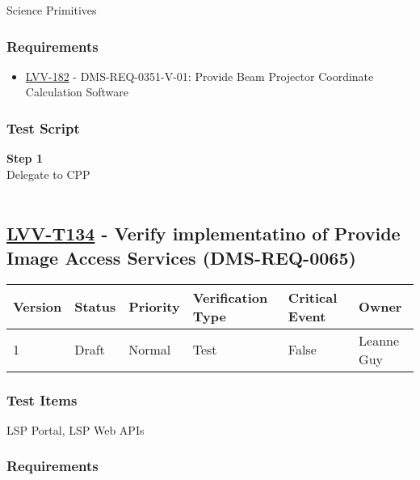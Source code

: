 Science Primitives~

\hypertarget{requirements-110}{%
\subsubsection{Requirements}\label{requirements-110}}

\begin{itemize}
\tightlist
\item
  \href{https://jira.lsstcorp.org/browse/LVV-182}{LVV-182} -
  DMS-REQ-0351-V-01: Provide Beam Projector Coordinate Calculation
  Software
\end{itemize}

\hypertarget{test-script-110}{%
\subsubsection{Test Script}\label{test-script-110}}

\textbf{Step 1}\\
Delegate to CPP\\
~\\

\hypertarget{lvv-t134---verify-implementatino-of-provide-image-access-services-dms-req-0065}{%
\subsection{\texorpdfstring{\href{https://jira.lsstcorp.org/secure/Tests.jspa\#/testCase/LVV-T134}{LVV-T134}
- Verify implementatino of Provide Image Access Services
(DMS-REQ-0065)}{LVV-T134 - Verify implementatino of Provide Image Access Services (DMS-REQ-0065)}}\label{lvv-t134---verify-implementatino-of-provide-image-access-services-dms-req-0065}}

\begin{longtable}[]{@{}llllll@{}}
\toprule
Version & Status & Priority & Verification Type & Critical Event &
Owner\tabularnewline
\midrule
\endhead
1 & Draft & Normal & Test & False & Leanne Guy\tabularnewline
\bottomrule
\end{longtable}

\hypertarget{test-items-110}{%
\subsubsection{Test Items}\label{test-items-110}}

LSP Portal, LSP Web APIs~

\hypertarget{requirements-111}{%
\subsubsection{Requirements}\label{requirements-111}}

